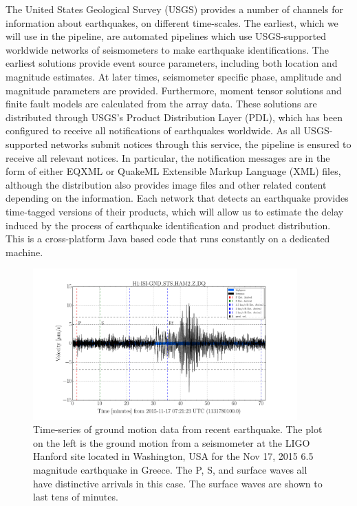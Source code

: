 \documentclass[reprint, prl, aps, showpacs]{revtex4-1}
\begin{document}
The United States Geological Survey (USGS) provides a number of channels for information about earthquakes, on different time-scales. 
The earliest, which we will use in the pipeline, are automated pipelines which use USGS-supported worldwide networks of seismometers to make earthquake identifications. 
The earliest solutions provide event source parameters, including both location and magnitude estimates.
At later times, seismometer specific phase, amplitude and magnitude parameters are provided.
Furthermore, moment tensor solutions and finite fault models are calculated from the array data.
These solutions are distributed through USGS's Product Distribution Layer (PDL), which has been configured to receive all notifications of earthquakes worldwide. 
As all USGS-supported networks submit notices through this service, the pipeline is ensured to receive all relevant notices.
In particular, the notification messages are in the form of either EQXML or QuakeML Extensible Markup Language (XML) files, although the distribution also provides image files and other related content depending on the information.
Each network that detects an earthquake provides time-tagged versions of their products, which will allow us to estimate the delay induced by the process of earthquake identification and product distribution.
This is a cross-platform Java based code that runs constantly on a dedicated machine. 

\begin{figure}[t]
\hspace*{-0.5cm}
\centering
\includegraphics[width=4in]{timeseries.pdf}
\caption{Time-series of ground motion data from recent earthquake. The plot on the left is the ground motion from a seismometer at the LIGO Hanford site located in Washington, USA for the Nov 17, 2015 6.5 magnitude earthquake in Greece. The P, S, and surface waves all have distinctive arrivals in this case. The surface waves are shown to last tens of minutes.}
 \label{fig:timeseries}
 \end{figure}
\end{document}
